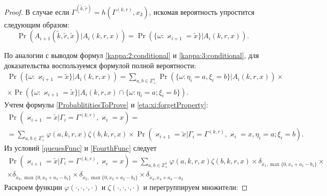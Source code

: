 \documentclass[a4paper,12pt,russian]{extarticle}
\begin{document}
\begin{proof}
В случае если $\Gamma^{(\tilde{k},\tilde{r})}=h(\Gamma^{(k,r)},x_3)$, искомая вероятность упростится следующим образом:
\begin{equation*}
\Pr (A_{i+1}(\tilde{k},\tilde{r},\tilde{x})| A_{i}({k},{r},{x})) 
=\Pr (\{\omega\colon \varkappa_{i+1}=\tilde{x}\}|A_{i}({k},{r},{x})).
\end{equation*}

По аналогии с выводом формул \eqref{kappa:2:conditional} и \eqref{kappa:3:conditional}, для доказательства воспользуемся формулой полной вероятности:
\begin{multline*}
\Pr (\{\omega\colon\varkappa_{i+1}=\tilde{x}\}|A_i(k,r,x) )= \sum_{a,b \in \mathbb{Z}_+^4} \Pr (\{\omega\colon\eta_i=a, \xi_i=b\}|A_i(k,r,x)) \times \\ 
\times
\Pr (\{\omega\colon\varkappa_{i+1}=\tilde{x}\}|A_i(k,r,x) \cap \{\omega\colon \eta_i=a; \xi_i=b\}).
\end{multline*}
Учтем формулы \eqref{ProbablititiesToProve} и \eqref{eta:xi:forgetProperty}:
\begin{multline*}
\Pr (\varkappa_{i+1}=\tilde{x}|\Gamma_{i}=\Gamma^{(k,r)},\varkappa_i=x)= \\
=\sum_{a,b \in \mathbb{Z}_+^4} \varphi(a,k,r,x) \zeta(b,k,r,x)
\times
\Pr (\varkappa_{i+1}=\tilde{x}|\Gamma_{i}=\Gamma^{(k,r)},\varkappa_i=x, \eta_i=a; \xi_i=b).
\end{multline*}
Из условий \eqref{queuesFunc} и \eqref{FourthFunc} следует
\begin{multline*}
\Pr (\varkappa_{i+1}=\tilde{x}|\Gamma_{i}=\Gamma^{(k,r)},\varkappa_i=x)=\sum_{a,b \in \mathbb{Z}_+^4} \varphi(a,k,r,x) \zeta(b,k,r,x)
\times \delta_{\tilde{x}_1,\max{\{0,x_1+a_1-b_1\}}} \times \\
\times \delta_{\tilde{x}_3,\max{\{0,x_3+a_3-b_3\}}} \times
\delta_{\tilde{x}_2,\max{\{0,x_2+a_2-b_2\}}} \times
\delta_{\tilde{x}_4,x_4+a_4-a_2}
\end{multline*}
Раскроем  функции $\varphi(\cdot, \cdot, \cdot, \cdot)$ и $\zeta(\cdot, \cdot, \cdot, \cdot)$ и перегруппируем множители:


\end{proof}
\end{document}
